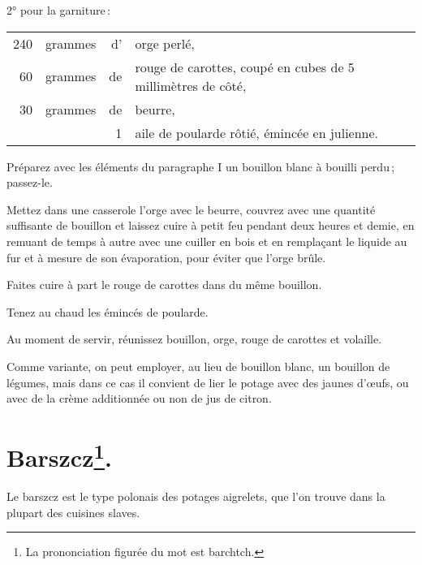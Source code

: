 \medskip

2° pour la garniture :

\medskip

\footnotesize
\begin{longtable}{rrrp{16em}}   
   240 & grammes  & d’ & orge perlé,                                                                      \\
    60 & grammes  & de & rouge de carottes, coupé en cubes de 5 millimètres de côté,                      \\
    30 & grammes  & de & beurre,                                                                          \\
       &          & 1  & aile de poularde rôtié, émincée en julienne.                                     \\
\end{longtable}
\normalsize                   

\medskip

\label{pg0214} \hypertarget{p0214}{}
Préparez avec les éléments du paragraphe I un bouillon blanc à bouilli perdu ;
passez-le.

Mettez dans une casserole l'orge avec le beurre, couvrez avec une quantité
suffisante de bouillon et laissez cuire à petit feu pendant deux heures et
demie, en remuant de temps à autre avec une cuiller en bois et en remplaçant le
liquide au fur et à mesure de son évaporation, pour éviter que l'orge brûle.

Faites cuire à part le rouge de carottes dans du même bouillon.

Tenez au chaud les émincés de poularde.

Au moment de servir, réunissez bouillon, orge, rouge de carottes et volaille.

\sk

Comme variante, on peut employer, au lieu de bouillon blanc, un bouillon de
légumes, mais dans ce cas il convient de lier le potage avec des jaunes d'œufs,
ou avec de la crème additionnée ou non de jus de citron.

\section*{\centering Barszcz\footnote{La prononciation figurée du mot est barchtch.}.}

Le barszcz est le type polonais des potages aigrelets, que l'on trouve dans la
plupart des cuisines slaves.

